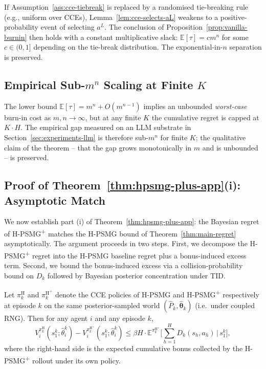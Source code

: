 If Assumption~\ref{ass:cce-tiebreak} is replaced by a randomised tie-breaking rule (e.g., uniform over CCEs), Lemma~\ref{lem:cce-selects-aL} weakens to a positive-probability event of selecting $a^L$. The conclusion of Proposition~\ref{prop:vanilla-burnin} then holds with a constant multiplicative slack: $\mathbb{E}[\tau] = c m^n$ for some $c \in (0, 1]$ depending on the tie-break distribution. The exponential-in-$n$ separation is preserved.

\subsection{Empirical Sub-\texorpdfstring{$m^n$}{m\^n} Scaling at Finite \texorpdfstring{$K$}{K}}

The lower bound $\mathbb{E}[\tau] = m^n + O(m^{n-1})$ implies an unbounded \emph{worst-case} burn-in cost as $m, n \to \infty$, but at any finite $K$ the cumulative regret is capped at $K \cdot H$. The empirical gap measured on an LLM substrate in Section~\ref{sec:experiments-llm} is therefore sub-$m^n$ for finite $K$; the qualitative claim of the theorem -- that the gap grows monotonically in $m$ and is unbounded -- is preserved.

\subsection{Proof of Theorem~\ref{thm:hpsmg-plus-app}(i): Asymptotic Match}
\label{app:hpsmg-plus-asymptotic-proof}

We now establish part (i) of Theorem~\ref{thm:hpsmg-plus-app}: the Bayesian regret of H-PSMG\textsuperscript{+} matches the H-PSMG bound of Theorem~\ref{thm:main-regret} asymptotically. The argument proceeds in two steps. First, we decompose the H-PSMG\textsuperscript{+} regret into the H-PSMG baseline regret plus a bonus-induced excess term. Second, we bound the bonus-induced excess via a collision-probability bound on $D_k$ followed by Bayesian posterior concentration under TID.

\begin{lemma}
\label{lem:bonus-decomp}
Let $\pi_k^{\mathrm{H}}$ and $\pi_k^{\mathrm{H}^+}$ denote the CCE policies of H-PSMG and H-PSMG\textsuperscript{+} respectively at episode $k$ on the same posterior-sampled world $(\hat P_k, \hat{\boldsymbol\theta}_k)$ (i.e.\ under coupled RNG). Then for any agent $i$ and any episode $k$,
\begin{equation}
V_i^{\pi_k^{\mathrm{H}}}(s_1^k; \hat\theta_i^k) - V_i^{\pi_k^{\mathrm{H}^+}}(s_1^k; \hat\theta_i^k) \leq \beta H \cdot \mathbb{E}^{\pi_k^{\mathrm{H}^+}}\bigg[\sum_{h=1}^H D_k(s_h, a_h) \,\Big|\, s_1^k\bigg],
\end{equation}
where the right-hand side is the expected cumulative bonus collected by the H-PSMG\textsuperscript{+} rollout under its own policy.
\end{lemma}

